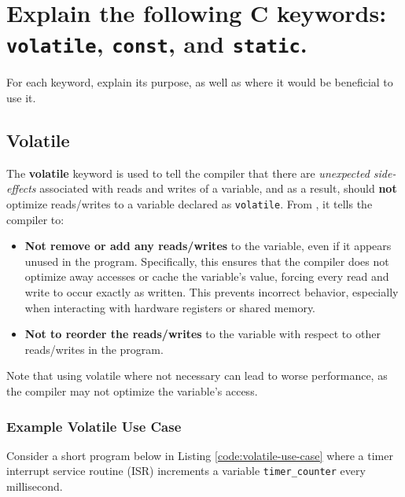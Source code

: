 \documentclass[main.tex]{subfiles}
\begin{document}
\section{Explain the following C keywords: \texttt{volatile}, \texttt{const}, and \texttt{static}.}
For each keyword, explain its purpose, as well as where it would be beneficial to use it.

\spoilerline

\subsection{Volatile}
The \textbf{volatile} keyword is used to tell the compiler that there are \textit{unexpected side-effects} associated with reads and writes of a variable, and as a result, should \textbf{not} optimize reads/writes to a variable declared as \texttt{volatile}. From \cite{wikipediaVolatile}, it tells the compiler to:
\begin{itemize}
    \item \textbf{Not remove or add any reads/writes} to the variable, even if it appears unused in the program. Specifically, this ensures that the compiler does not optimize away accesses or cache the variable's value, forcing every read and write to occur exactly as written. This prevents incorrect behavior, especially when interacting with hardware registers or shared memory.
    \item \textbf{Not to reorder the reads/writes} to the variable with respect to other reads/writes in the program.
\end{itemize}

\noindent Note that using volatile where not necessary can lead to worse performance, as the compiler may not optimize the variable's access. 

\subsubsection{Example Volatile Use Case}
Consider a short program below in Listing \ref{code:volatile-use-case} where a timer interrupt service routine (ISR) increments a variable \texttt{timer\_counter} every millisecond. 


\end{document}
